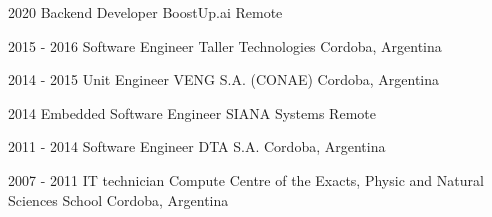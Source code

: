   \cventry
    {2020} %
    {Backend Developer} %
    {BoostUp.ai} %
    {Remote} %
    {}
    {}

  \cventry
    {2015 - 2016} %
    {Software Engineer} %
    {Taller Technologies} %
    {Cordoba, Argentina} %
    {}
    {}

  \cventry
    {2014 - 2015} %
    {Unit Engineer} %
    {VENG S.A. (CONAE)} %
    {Cordoba, Argentina} %
    {}
    {}

  \cventry
    {2014} %
    {Embedded Software Engineer} %
    {SIANA Systems} %
    {Remote} %
    {}
    {}

  \cventry
    {2011 - 2014} %
    {Software Engineer} %
    {DTA S.A.} %
    {Cordoba, Argentina} %
    {}
    {}

  \cventry
    {2007 - 2011} %
    {IT technician} %
    {Compute Centre of the Exacts, Physic and Natural Sciences School} %
    {Cordoba, Argentina} %
    {}
    {}

